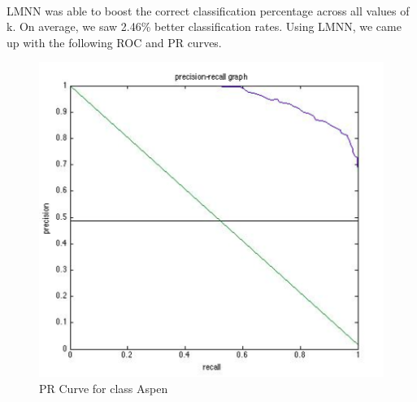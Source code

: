 \documentclass[12pt]{article}
\begin{document}
\paragraph{}
LMNN was able to boost the correct classification percentage across all values of k. On average, we saw 2.46\% better classification rates. Using LMNN, we came up with the following ROC and PR curves.
    \begin{figure}[H]
    \begin{minipage}[b]{\linewidth}
    \centering
    \includegraphics[width=\linewidth]{images/AspenPRCurve.png}
    \caption{PR Curve for class Aspen}
    \label{fig:chapter001_dist_001}
    \end{minipage}
    \end{figure}
    \hspace{0.5cm}
\end{document}
